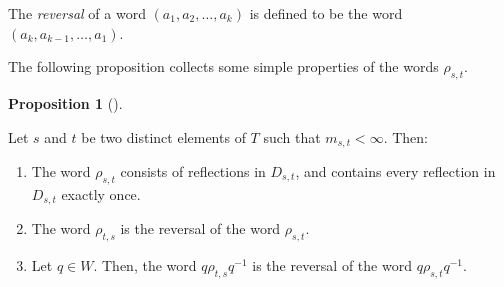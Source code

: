 \documentclass[numbers=enddot,12pt,final,onecolumn,notitlepage,abstracton]{scrartcl}%
\theoremstyle{definition}
\newtheorem{prop}[theo]{Proposition}
\newenvironment{proposition}[1][]
{\begin{prop}[#1]\begin{leftbar}}
{\end{leftbar}\end{prop}}
\begin{document}
The \emph{reversal} of a word $\left(  a_{1},a_{2},\ldots,a_{k}\right)  $ is
defined to be the word $\left(  a_{k},a_{k-1},\ldots,a_{1}\right)  $.

The following proposition collects some simple properties of the words
$\rho_{s,t}$.

\begin{proposition}
\label{prop.rhost}Let $s$ and $t$ be two distinct elements of $T$ such that
$m_{s,t}<\infty$. Then:

\begin{enumerate}
\item[\textbf{(a)}] The word $\rho_{s,t}$ consists of reflections in $D_{s,t}%
$, and contains every reflection in $D_{s,t}$ exactly once.

\item[\textbf{(b)}] The word $\rho_{t,s}$ is the reversal of the word
$\rho_{s,t}$.

\item[\textbf{(c)}] Let $q\in W$. Then, the word $q\rho_{t,s}q^{-1}$ is the
reversal of the word $q\rho_{s,t}q^{-1}$.
\end{enumerate}
\end{proposition}
\end{document}
